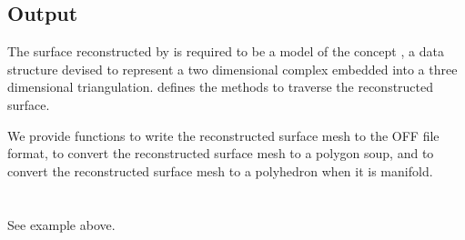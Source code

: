\subsection{Output}

The surface reconstructed by  is required to be a model of the concept , a data structure devised to represent a two dimensional complex embedded into a three dimensional triangulation.  defines the methods to traverse the reconstructed surface.

We provide functions to write the reconstructed surface mesh to the OFF file format, to convert the reconstructed surface mesh to a polygon soup, and to convert the reconstructed surface mesh to a polyhedron when it is manifold.
  \\
  \\
  \\
See  example above.